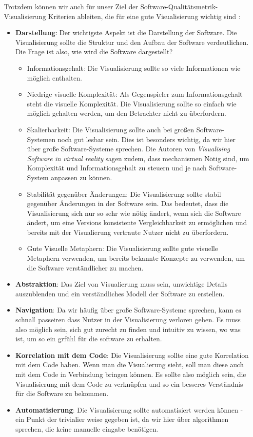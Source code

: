 Trotzdem können wir auch für unser Ziel der Software-Qualitätsmetrik-Visualisierung Kriterien ableiten, die für eine gute Visualisierung wichtig sind \cite{visSoftwareVR}:
\begin{itemize}
    \item \textbf{Darstellung}: Der wichtigste Aspekt ist die Darstellung der Software. Die Visualisierung sollte die Struktur und den Aufbau der Software verdeutlichen. Die Frage ist also, wie wird die Software dargestellt? 
    \begin{itemize}
        \item Informationsgehalt: Die Visualisierung sollte so viele Informationen wie möglich enthalten.
        \item Niedrige visuelle Komplexität: Als Gegenspieler zum Informationsgehalt steht die visuelle Komplexität. Die Visualisierung sollte so einfach wie möglich gehalten werden, um den Betrachter nicht zu überfordern.
        \item Skalierbarkeit: Die Visualisierung sollte auch bei großen Software-Systemen noch gut lesbar sein. Dies ist besonders wichtig, da wir hier über große Software-Systeme sprechen. Die Autoren von \textit{Visualising Software in virtual reality} \cite{visSoftwareVR} sagen zudem, dass mechanismen Nötig sind, um Komplexität und Informationsgehalt zu steuern und je nach Software-System anpassen zu können.
        \item Stabilität gegenüber Änderungen: Die Visualisierung sollte stabil gegenüber Änderungen in der Software sein. Das bedeutet, dass die Visualisierung sich nur so sehr wie nötig ändert, wenn sich die Software ändert, um eine Versions konsistente Vergleichbarkeit zu ermöglichen und bereits mit der Visualierung vertraute Nutzer nicht zu überfordern.
        \item Gute Visuelle Metaphern: Die Visualisierung sollte gute visuelle Metaphern verwenden, um bereits bekannte Konzepte zu verwenden, um die Software verständlicher zu machen.
    \end{itemize}
    \item \textbf{Abstraktion}: Das Ziel von Visualierung muss sein, unwichtige Details auszublenden und ein verständliches Modell der Software zu erstellen. 
    \item \textbf{Navigation}: Da wir häufig über große Software-Systeme sprechen, kann es schnall passeiren dass Nutzer in der Visualisierung verloren gehen. Es muss also möglich sein, sich gut zurecht zu finden und intuitiv zu wissen, wo was ist, um so ein grfühl für die software zu erhalten.
    \item \textbf{Korrelation mit dem Code}: Die Visualisierung sollte eine gute Korrelation mit dem Code haben. Wenn man die Visualierung sieht, soll man diese auch mit dem Code in Verbindung bringen können. Es sollte also möglich sein, die Visualisierung mit dem Code zu verknüpfen und so ein besseres Verständnis für die Software zu bekommen.
    \item \textbf{Automatisierung}: Die Visualisierung sollte automatisiert werden können - ein Punkt der trivialier weise gegeben ist, da wir hier über algorithmen sprechen, die keine manuelle eingabe benötigen.
\end{itemize}


